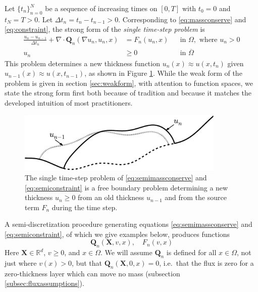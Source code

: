 \documentclass[final,leqno,onefignum,onetabnum]{siamltex1213bueler}
\newcommand\bQ{\mathbf{Q}}
\newcommand\bX{\mathbf{X}}
\newcommand{\Div}{\nabla\cdot}
\renewcommand{\grad}{\nabla}
\newcommand\RR{\mathbb{R}}
\begin{document}
Let $\{t_n\}_{n=0}^N$ be a sequence of increasing times on $[0,T]$ with $t_0=0$ and $t_N=T>0$.  Let $\Delta t_n = t_n-t_{n-1}>0$.  Corresponding to \eqref{eq:massconserve} and \eqref{eq:constraint}, the strong form of the \emph{single time-step problem} is
\begin{align}
\frac{u_n - u_{n-1}}{\Delta t_n} + \Div \bQ_n(\grad u_n,u_n,x) &= F_n(u_n,x) &&\text{in } \Omega, \text{ where } u_n > 0 \label{eq:semimassconserve} \\
u_n &\ge 0 &&\text{in } \overline{\Omega} \label{eq:semiconstraint}
\end{align}
This problem determines a new thickness function $u_n(x) \approx u(x,t_n)$ given $u_{n-1}(x) \approx u(x,t_{n-1})$, as shown in Figure \ref{fig:timestepcartoon}.  While the weak form of the problem is given in section \ref{sec:weakform}, with attention to function spaces, we state the strong form first both because of tradition and because it matches the developed intuition of most practitioners.

\begin{figure}[ht]
\begin{center}
\includegraphics[width=3.9in,keepaspectratio=true]{time-step-cartoon}
\end{center}
\caption{The single time-step problem of \eqref{eq:semimassconserve} and \eqref{eq:semiconstraint} is a free boundary problem determining a new thickness $u_n\ge 0$ from an old thickness $u_{n-1}$ and from the source term $F_n$ during the time step.}
\label{fig:timestepcartoon}
\end{figure}

A semi-discretization procedure generating equations \eqref{eq:semimassconserve} and \eqref{eq:semiconstraint}, of which we give examples below, produces functions
\begin{equation}
\bQ_n(\bX,v,x), \quad F_n(v,x) \label{eq:functionalforms}
\end{equation}
Here $\bX\in\RR^d$, $v\ge 0$, and $x\in \Omega$.  We will assume $\bQ_n$ is defined for all $x\in\Omega$, not just where $v(x)>0$, but that $\bQ_n(\bX,0,x)=0$, i.e.~that the flux is zero for a zero-thickness layer which can move no mass (subsection \ref{subsec:fluxassumptions}).
\end{document}
